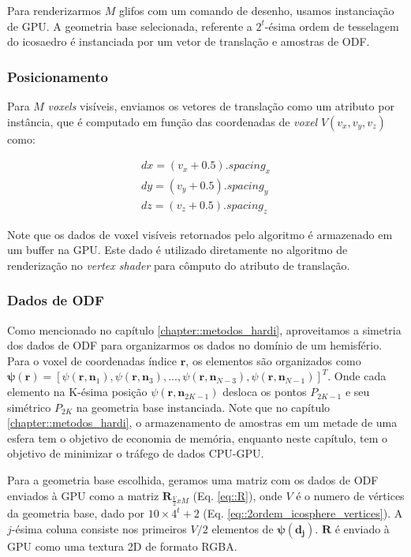 \documentclass[
    12pt,                %
    oneside,            %
    a4paper,            %
    english,            %
    french,                %
    spanish,            %
    brazil                %
    ]{abntex2}
\begin{document}
Para renderizarmos $M$ glifos com um comando de desenho, usamos instanciação de GPU. A geometria base selecionada, referente a $2^t$-ésima ordem de tesselagem do icosaedro é instanciada por um vetor de translação e amostras de ODF.

\subsubsection{Posicionamento}

Para $M$ \textit{voxels} visíveis, enviamos os vetores de translação como um atributo por instância, que é computado em função das coordenadas de \textit{voxel} $V(v_x, v_y, v_z)$ como:

\begin{align}
 \label{eq::translation}
    dx = (v_x + 0.5).spacing_x \nonumber\\
    dy = (v_y + 0.5).spacing_y \\
    dz = (v_z + 0.5).spacing_z \nonumber
\end{align}

Note que os dados de voxel visíveis retornados pelo algoritmo é armazenado em um buffer na GPU. Este dado é utilizado diretamente no algoritmo de renderização no \textit{vertex shader} para cômputo do atributo de translação.

\subsubsection{Dados de ODF}
\label{sssec::dados_de_odf}

Como mencionado no capítulo \ref{chapter::metodos_hardi}, aproveitamos a simetria dos dados de ODF para organizarmos os dados no domínio de um hemisfério. Para o voxel de coordenadas índice $\mathbf{r}$, os elementos são organizados como $\boldsymbol{\psi}(\mathbf{r}) = [
\psi(\mathbf{r}, \mathbf{n}_1),
\psi(\mathbf{r}, \mathbf{n}_3), ...,
\psi(\mathbf{r}, \mathbf{n}_{N-3}),
\psi(\mathbf{r}, \mathbf{n}_{N-1})]^T$. Onde cada elemento na K-ésima posição $\psi(\mathbf{r}, \mathbf{n}_{2K-1})$ desloca os pontos $P_{2K-1}$ e seu simétrico $P_{2K}$ na geometria base instanciada. Note que no capítulo \ref{chapter::metodos_hardi}, o armazenamento de amostras em um metade de uma esfera tem o objetivo de economia de memória, enquanto neste capítulo, tem o objetivo de minimizar o tráfego de dados CPU-GPU.

Para a geometria base escolhida, geramos uma matriz com os dados de ODF enviados à GPU como a matriz $\mathbf{R}_{\frac{V}{2}xM}$ (Eq. \ref{eq::R}), onde $V$ é o numero de vértices da geometria base, dado por $10 \times 4^t + 2$ (Eq. \ref{eq::2ordem_icosphere_vertices}). A $j$-ésima coluna consiste nos primeiros $V/2$ elementos de $\boldsymbol{\psi}(\mathbf{d_j})$. $\mathbf{R}$ é enviado à GPU como uma textura 2D de formato RGBA.
\end{document}
